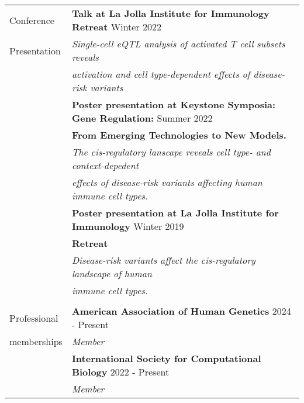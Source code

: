 \documentclass[letterpaper, 11pt]{article}
\begin{document}
\begin{longtable}{p{1.1in}p{6.05in}}

{\sc Conference} 
& \textbf{Talk at La Jolla Institute for Immunology Retreat} \hfill Winter 2022 \\
{\sc Presentation} & \textit{Single-cell eQTL analysis of activated T cell subsets reveals} \\
& \textit{activation and cell type-dependent effects of disease-risk variants} \\
& \textbf{Poster presentation at Keystone Symposia: Gene Regulation:} \hfill Summer 2022 \\
& \textbf{From Emerging Technologies to New Models.} \\
& \textit{The cis-regulatory lanscape reveals cell type- and context-depedent} \\
& \textit{effects of disease-risk variants affecting human immune cell types.}  \\
& \textbf{Poster presentation at La Jolla Institute for Immunology } \hfill Winter 2019 \\
& \textbf{Retreat} \\
& \textit{Disease-risk variants affect the cis-regulatory landscape of human} \\ 
& \textit{immune cell types.} \\
& \\






{\sc Professional}
& {\textbf{American Association of Human Genetics}} \hfill 2024 - Present \\
{\sc memberships}
& \textit{Member} \\
& {\textbf{International Society for Computational Biology}} \hfill 2022 - Present \\
& \textit{Member} \\


\end{longtable}
\end{document}
